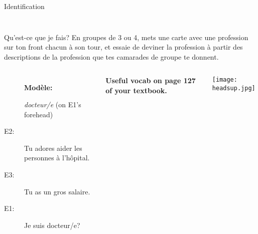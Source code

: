 \documentclass{beamer}
\begin{document}
\begin{frame}{Identification}
\begin{columns}
\begin{minipage}[c][0.6\textheight]{\linewidth}
\begin{center}
{            }
          \end{center}
        \end{minipage}
    \end{columns}
  \end{frame}

  \begin{frame}{Qu'est-ce que je fais?}
    En groupes de 3 ou 4, mets une carte avec une profession sur ton front chacun à son tour, et essaie de deviner la profession à partir des descriptions de la profession que tes camarades de groupe te donnent. \\
    \begin{columns}
        \begin{description}
          \item[] \textbf{Modèle:}
          \item[] \emph{docteur/e} (on E1's forehead)
          \item[E2:] Tu adores aider les personnes à l'hôpital.
          \item[E3:] Tu as un gros salaire.
          \item[E1:] Je suis docteur/e?
        \end{description}
        \begin{center}
          \scriptsize
          \textbf{Useful vocab on page 127 of your textbook.}
        \end{center}
        \begin{center}
          \texttt{[image: headsup.jpg]}
        \end{center}
    \end{columns}
  \end{frame}
\end{document}
